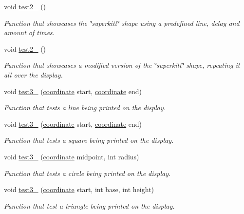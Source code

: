 \begin{DoxyCompactItemize}
void \hyperlink{classexamples_a380d9b60c1e5ecb6977a07cad5046579}{test2\+\_} ()
\begin{DoxyCompactList}\small\item\em Function that showcases the \char`\"{}superkitt\char`\"{} shape using a predefined line, delay and amount of times. \end{DoxyCompactList}\item 
\mbox{\label{classexamples_a06931f80e803efec7092983d52965628}} 
void \hyperlink{classexamples_a06931f80e803efec7092983d52965628}{test2\+\_} ()
\begin{DoxyCompactList}\small\item\em Function that showcases a modified version of the \char`\"{}superkitt\char`\"{} shape, repeating it all over the display. \end{DoxyCompactList}\item 
void \hyperlink{classexamples_a13dcac0e0ff1501fbe91cb6cd94e9569}{test3\+\_} (\hyperlink{classcoordinate}{coordinate} start, \hyperlink{classcoordinate}{coordinate} end)
\begin{DoxyCompactList}\small\item\em Function that tests a line being printed on the display. \end{DoxyCompactList}\item 
void \hyperlink{classexamples_ae49a88c23216177d92ef54295d4de334}{test3\+\_} (\hyperlink{classcoordinate}{coordinate} start, \hyperlink{classcoordinate}{coordinate} end)
\begin{DoxyCompactList}\small\item\em Function that tests a square being printed on the display. \end{DoxyCompactList}\item 
void \hyperlink{classexamples_aae40706381a96805c7be020ef1763696}{test3\+\_} (\hyperlink{classcoordinate}{coordinate} midpoint, int radius)
\begin{DoxyCompactList}\small\item\em Function that tests a circle being printed on the display. \end{DoxyCompactList}\item 
void \hyperlink{classexamples_a8dab7396ebffe15c572f2488d2e3edc0}{test3\+\_} (\hyperlink{classcoordinate}{coordinate} start, int base, int height)
\begin{DoxyCompactList}\small\item\em Function that test a triangle being printed on the display. \end{DoxyCompactList}\item 

\end{DoxyCompactItemize}
